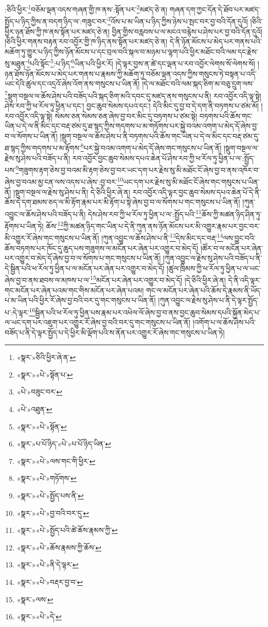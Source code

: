:ཅིའི་ཕྱིར་\footnote{«སྣར་»ཅིའི་ཕྱིར་ཞེ་ན་}བཅོམ་ལྡན་འདས་གཞན་གྱི་ཁ་ནས་:སྟོན་པར་\footnote{«སྣར་»«པེ་»སྟོན་པ་}མཛད་ཅེ་ན། གཞན་དག་ཀྱང་དོན་དེ་ཐོབ་པར་མཛད་སྤྱོད་པ་ཉིད་ཀྱིས་ན་བདག་ཉིད་ལ་:གཟུང་བར་\footnote{«པེ་»བཟུང་བར་}འོས་པ་མ་ཡིན་པ་ཉིད་ཀྱིས་ཉེས་པ་སྤང་བར་བྱ་བའི་དོན་དུའོ། །ཅིའི་ཕྱིར་ཉན་ཐོས་ཀྱི་ཁ་ནས་སྟོན་པར་མཛད་ཅེ་ན། བྱིན་གྱིས་བརླབས་པ་ལ་མངའ་བརྙེས་པ་ཤེས་པར་བྱ་བའི་དོན་དུའོ། །ཅིའི་ཕྱིར་གནས་བརྟན་རབ་འབྱོར་གྱི་ཁ་ཉིད་ནས་སྟོན་པར་མཛད་ཅེ་ན། དེ་ནི་ཉོན་མོངས་པ་མེད་པར་གནས་པའི་མཆོག་ཏུ་གྱུར་པ་ཉིད་ཀྱིས་ཉོན་མོངས་པ་དང་བྲལ་བའི་སྐལ་བ་མཉམ་པ་ལྷག་པའི་ཕྱིར་མཐོང་བའི་ལམ་དང་རྗེས་སུ་མཐུན་\footnote{«པེ་»འཐུན་}པའི་སྟོང་\footnote{«སྣར་»«པེ་»སྟོན་}:པ་ཉིད་\footnote{«སྣར་»པ་པོ་ཉིད་«པེ་»པ་པོ་ཉིད་ཡིན་}ཡིན་པའི་ཕྱིར་རོ། །དེ་ལྟར་བྱས་ན་ཚེ་དང་ལྡན་པ་རབ་འབྱོར་ལེགས་སོ་ལེགས་སོ། །ཉན་ཐོས་ཉོན་མོངས་པ་མེད་པར་གནས་པ་རྣམས་ཀྱི་མཆོག་ཏུ་བཅོམ་ལྡན་འདས་ཀྱིས་གསུངས་ཏེ་བསྟན་པ་འདི་ཡང་དེའི་ཚུལ་དང་འདྲའོ་ཞེས་འོག་ནས་གསུངས་པ་ཡིན་ནོ། །དེ་ལ་མཐོང་བའི་ལམ་སྐད་ཅིག་མ་བཅུ་དྲུག་ལས་\footnote{«སྣར་»«པེ་»ལས་གང་གི་ཕྱིར་}སྡུག་བསྔལ་ལ་ཆོས་ཤེས་པའི་བཟོད་པའི་སྐད་ཅིག་མའི་དབང་དུ་མཛད་ནས་གསུངས་པ་ནི། རབ་འབྱོར་འདི་ལྟ་སྟེ། ཤེས་རབ་ཀྱི་ཕ་རོལ་ཏུ་ཕྱིན་པ་དང་། བྱང་ཆུབ་སེམས་དཔའ་དང་། དེའི་མིང་དུ་བྱ་བ་དེ་དག་ནི་བཏགས་པ་ཙམ་མོ། །རབ་འབྱོར་འདི་ལྟ་སྟེ། སེམས་ཅན་སེམས་ཅན་ཞེས་བྱ་བར་མིང་དུ་བཏགས་པ་ཙམ་སྟེ། བཏགས་པའི་ཆོས་གང་ཡིན་པ་དེ་ལ་ནི་མིང་དང་བརྡ་ཙམ་དུ་ཐ་སྙད་ཀྱིས་གདགས་པ་མ་གཏོགས་པར་སྐྱེ་བའམ་འགག་པ་མེད་དོ་ཞེས་བྱ་བ་ལ་སོགས་པ་ཡིན་ནོ། །སྡུག་བསྔལ་ལ་ཆོས་ཤེས་པ་ནི་བཏགས་པའི་ཆོས་གང་ཡིན་པ་དེ་ལ་མིང་དང་བརྡ་ཙམ་དུ་ཐ་སྙད་ཀྱིས་གདགས་པ་མ་རྟོགས་\footnote{«སྣར་»«པེ་»གཏོགས་}པར་སྐྱེ་བའམ་འགག་པ་མེད་དོ་ཞེས་གང་གསུངས་པ་ཡིན་ནོ། །སྡུག་བསྔལ་ལ་རྗེས་སུ་ཤེས་པའི་བཟོད་པ་ནི། རབ་འབྱོར་བྱང་ཆུབ་སེམས་དཔའ་ཆེན་པོ་ཤེས་རབ་ཀྱི་ཕ་རོལ་ཏུ་ཕྱིན་པ་ལ་:སྤྱོད་པས་\footnote{«སྣར་»«པེ་»སྤྱོད་པས་ནི་}གཟུགས་རྟག་ཅེས་བྱ་བའམ་མི་རྟག་ཅེས་བྱ་བར་ཡང་དག་པར་རྗེས་སུ་མི་མཐོང་ངོ་ཞེས་བྱ་བ་ནས་འཁོར་བ་ཞེས་བྱ་བའམ་མྱ་ངན་ལས་འདས་པ་ཞེས་:བྱ་བར་\footnote{«སྣར་»«པེ་»བྱ་བའི་བར་དུ་}ཡང་དག་པར་རྗེས་སུ་མི་མཐོང་ངོ་ཞེས་གང་གསུངས་པ་ཡིན་ནོ། །སྡུག་བསྔལ་ལ་རྗེས་སུ་ཤེས་པ་ནི། དེ་ཅིའི་ཕྱིར་ཞེ་ན། རབ་འབྱོར་འདི་ལྟར་བྱང་ཆུབ་སེམས་དཔའ་ཆེན་པོ་དེ་ནི་ཆོས་དེ་དག་ཐམས་ཅད་ལ་མི་རྟོག་རྣམ་པར་མི་རྟོག་པ་སྟེ་ཞེས་བྱ་བ་ལ་སོགས་པ་གང་གསུངས་པ་ཡིན་ནོ། །ཀུན་འབྱུང་ལ་ཆོས་ཤེས་པའི་བཟོད་པ་ནི། དེས་ཤེས་རབ་ཀྱི་ཕ་རོལ་ཏུ་ཕྱིན་པ་ལ་:སྤྱོད་པའི་\footnote{«སྣར་»«པེ་»སྤྱོད་པའི་ཚེ་ཆོས་རྣམས་ཀྱི་}ཆོས་ཀྱི་མཚན་ཉིད་ཤིན་ཏུ་རྟོགས་པ་ཡིན་ཏེ། ཆོས་\footnote{«སྣར་»«པེ་»ཆོས་རྣམས་ཀྱི་ཆོས་}ཀྱི་མཚན་ཉིད་གང་ཡིན་པ་དེ་ནི་ཀུན་ནས་ཉོན་མོངས་པར་མི་འགྱུར་རྣམ་པར་བྱང་བར་མི་འགྱུར་རོ་ཞེས་གང་གསུངས་པ་ཡིན་ནོ། །ཀུན་འབྱུང་ལ་ཆོས་ཤེས་པ་ནི་\footnote{«སྣར་»«པེ་»ནི་དེ་ལྟར་}དེས་མིང་དང་བརྡ་\footnote{«སྣར་»«པེ་»བརྡར་བྱ་བ་}ལས་བྱུང་བའི་ཆོས་བཏགས་པར་ཁོང་དུ་ཆུད་པས་གཟུགས་ལ་མངོན་པར་ཞེན་པར་འགྱུར་བ་མེད་དོ། །ཚོར་བ་ལ་མངོན་པར་ཞེན་པར་འགྱུར་བ་མེད་དོ་ཞེས་བྱ་བ་ལ་སོགས་པ་གང་གསུངས་པ་ཡིན་ནོ། །ཀུན་འབྱུང་ལ་རྗེས་སུ་ཤེས་པའི་བཟོད་པ་ནི་དེ་སྦྱིན་པའི་ཕ་རོལ་ཏུ་ཕྱིན་པ་ལ་མངོན་པར་ཞེན་པར་འགྱུར་བ་མེད་དོ། །ཚུལ་ཁྲིམས་ཀྱི་ཕ་རོལ་ཏུ་ཕྱིན་པ་ལ་ཡང་ཞེས་བྱ་བ་ནས་ཐབས་ལ་མཁས་པ་ལ་\footnote{«སྣར་»ལས་}མངོན་པར་ཞེན་པར་འགྱུར་བ་མེད་དོ། །དེ་ཅིའི་ཕྱིར་ཞེ་ན། དེ་ནི་འདི་ལྟར་གང་མངོན་པར་ཞེན་པའམ་གང་གིས་མངོན་པར་ཞེན་པའམ། གང་ལ་མངོན་པར་ཞེན་པའི་ཆོས་དེ་རྣམས་ནི་ཡོད་པ་མ་ཡིན་པའི་ཕྱིར་རོ་ཞེས་བྱ་བའི་བར་དུ་གང་གསུངས་པ་ཡིན་ནོ། །ཀུན་འབྱུང་ལ་རྗེས་སུ་ཤེས་པ་ནི་དེ་ལྟར་སྤྱོད་པ་:དེ་ལྟར་\footnote{«སྣར་»«པེ་»དེ་}སྦྱིན་པའི་ཕ་རོལ་ཏུ་ཕྱིན་པས་རྣམ་པར་འཕེལ་ལོ་ཞེས་བྱ་བ་ནས་བྱང་ཆུབ་སེམས་དཔའི་སྐྱོན་མེད་པ་ལ་ཡང་དག་པར་འཇུག་པར་འགྱུར་རོ་ཞེས་བྱ་བའི་བར་དུ་གང་གསུངས་པ་ཡིན་ནོ། །འགོག་པ་ལ་ཆོས་ཤེས་པའི་བཟོད་པ་ནི་དེ་ལྟར་སྤྱོད་པ་དེ་ཕྱིར་མི་ལྡོག་པའི་ས་ནོན་པར་འགྱུར་རོ་ཞེས་གང་གསུངས་པ་ཡིན་ཏེ། 